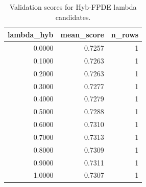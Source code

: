 \begin{table}[t]
\caption{Validation scores for Hyb-FPDE lambda candidates.}
\label{tab:lambda_distribution_computed}
\centering
\begin{tabular}{rrr}
\toprule
lambda\_hyb & mean\_score & n\_rows \\
\midrule
0.0000 & 0.7257 & 1 \\
0.1000 & 0.7263 & 1 \\
0.2000 & 0.7263 & 1 \\
0.3000 & 0.7277 & 1 \\
0.4000 & 0.7279 & 1 \\
0.5000 & 0.7288 & 1 \\
0.6000 & 0.7310 & 1 \\
0.7000 & 0.7313 & 1 \\
0.8000 & 0.7309 & 1 \\
0.9000 & 0.7311 & 1 \\
1.0000 & 0.7307 & 1 \\
\bottomrule
\end{tabular}

\end{table}
